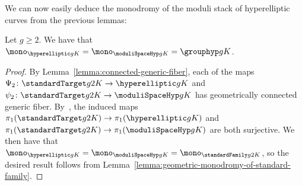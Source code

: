 We can now easily deduce the monodromy of the moduli stack of hyperelliptic
curves from the previous lemmas:
\begin{lemma}
	\label{lemma:moduli-stack-monodromy}
	Let $g \geq 2$. We have that $\mono_{\hyperelliptic g K} = \mono_{\moduliSpaceHyp g K} = \grouphyp g {K}$.
\end{lemma}
\begin{proof}
By Lemma~\ref{lemma:connected-generic-fiber}, each of the maps $\Psi_2 \colon \standardTarget g 2 K \rightarrow \hyperelliptic g K$ and $\psi_2 \colon \standardTarget g 2 K \rightarrow \moduliSpaceHyp g K$ has geometrically connected generic fiber.
	By~\cite[Proposition 5.2]{landesman-swaminathan-tao-xu:rational-families},
	the induced maps $\pi_1(\standardTarget g 2 K) \rightarrow \pi_1(\hyperelliptic g K)$ and $\pi_1(\standardTarget g 2 K) \rightarrow \pi_1(\moduliSpaceHyp g K)$ are both surjective. We then have that \mbox{$\mono_{\hyperelliptic g K} = \mono_{\moduliSpaceHyp g K} = \mono_{\standardFamily g 2 K}$,}
so the desired result follows from Lemma~\ref{lemma:geometric-monodromy-of-standard-family}.
%
%
\end{proof}

